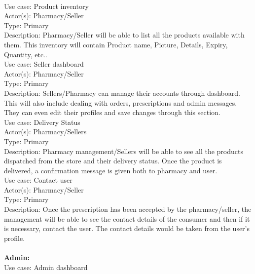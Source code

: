 \documentclass{article}
\begin{document}
\vspace{0.5cm}
\\Use case:    Product inventory\\
Actor(s):    Pharmacy/Seller     \\                                    
 Type:          Primary  \\
Description:  Pharmacy/Seller will be able to list all the products available with them. This inventory will contain Product name, Picture, Details, Expiry, Quantity, etc..
\vspace{0.5cm}
\\Use case:    Seller dashboard\\
Actor(s):    Pharmacy/Seller\\
Type:          Primary\\
Description:  Sellers/Pharmacy can manage their accounts through dashboard. This will also include dealing with orders, prescriptions and admin messages. They can even edit their profiles and save changes through this section.
\vspace{0.5cm}
\\Use case:    Delivery Status\\
Actor(s):      Pharmacy/Sellers  \\                                   
  Type:            Primary         \\                            
 Description:  Pharmacy management/Sellers will be able to see all the products dispatched from the store and their delivery status. Once the product is delivered, a confirmation message is given both to pharmacy and user.
\vspace{0.5cm}
\\Use case:    Contact user\\
Actor(s):      Pharmacy/Seller  \\                                
   Type:            Primary  \\                               
Description:  Once the prescription has been accepted by the pharmacy/seller, the management will be able to see the contact details of the consumer and then if it is necessary, contact the user. The contact details would be taken from the user’s profile.\\
\vspace{1.0cm}
\\\textbf{Admin:}
\vspace{0.5cm}
\\Use case:    Admin dashboard\\
\end{document}
